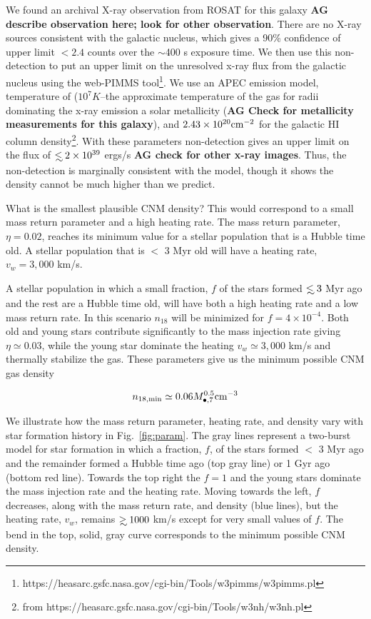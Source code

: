 \documentclass[usenatbib,fleqn]{mnras}
\newcommand\lsim{\mathrel{\rlap{\lower4pt\hbox{\hskip1pt$\sim$}}
    \raise1pt\hbox{$<$}}}
\newcommand\gsim{\mathrel{\rlap{\lower4pt\hbox{\hskip1pt$\sim$}}
    \raise1pt\hbox{$>$}}}
\newcommand{\Mbh}[1][]{M_{\bullet#1}}
\begin{document}
We found an archival X-ray observation from ROSAT for this galaxy {\bf
  AG describe observation here; look for other observation}. There are
no X-ray sources consistent with the galactic nucleus, which gives a
90\% confidence of upper limit $<2.4$ counts over the $\sim$400 s
exposure time. We then use this non-detection to put an upper limit on
the unresolved x-ray flux from the galactic nucleus using the
web-PIMMS
tool\footnote{https://heasarc.gsfc.nasa.gov/cgi-bin/Tools/w3pimms/w3pimms.pl}. We
use an APEC emission model, temperature of ($10^{7} K$--the
approximate temperature of the gas for radii dominating the x-ray
emission a solar metallicity ({\bf AG Check for metallicity
  measurements for this galaxy}), and $2.43\times 10^{20} {\rm cm^{-2}}$ for
the galactic HI column density\footnote{from https://heasarc.gsfc.nasa.gov/cgi-bin/Tools/w3nh/w3nh.pl}. With
these parameters non-detection gives an upper limit on the flux of
$\lsim 2\times 10^{39}$ ergs/s {\bf AG check for other x-ray
  images}. Thus, the non-detection is marginally consistent with the
model, though it shows the density cannot be much higher than we
predict.

What is the smallest plausible CNM density? This would correspond to a
small mass return parameter and a high heating rate. The mass return
parameter, $\eta=0.02$, reaches its minimum value for a stellar
population that is a Hubble time old. A stellar population
that is $<$ 3 Myr old will have a heating rate, $v_w=3,000$ km/s.

A stellar population in which a small fraction, $f$ of the stars
formed $\lsim 3$ Myr ago and the rest are a Hubble time old, will have
both a high heating rate and a low mass return rate. In this scenario
$n_{18}$ will be minimized for $f=4\times 10^{-4}$. Both old and young
stars contribute significantly to the mass injection rate giving
$\eta\simeq 0.03$, while the young star dominate the heating
$v_w\simeq 3,000$ km/s and thermally stabilize the gas. These
parameters give us the minimum possible CNM gas density

\begin{equation}
n_{\rm 18,min}\simeq 0.06 \Mbh[,7]^{0.5} {\rm cm^{-3}}
\label{eq:n18min}
\end{equation}

We illustrate how the mass return parameter, heating rate, and
density vary with star formation history in Fig.~\ref{fig:param}. The
gray lines represent a two-burst model for star formation in which a
fraction, $f$, of the stars formed $<$ 3 Myr ago and the remainder
formed a Hubble time ago (top gray line) or 1 Gyr ago (bottom red
line).  Towards the top right the $f=1$ and the young stars dominate
the mass injection rate and the heating rate.  Moving towards the
left, $f$ decreases, along with the mass return rate, and density
(blue lines), but the heating rate, $v_w$, remains $\gsim 1000$ km/s
except for very small values of $f$. The bend in the top, solid, gray curve
corresponds to the minimum possible CNM density.
\end{document}
